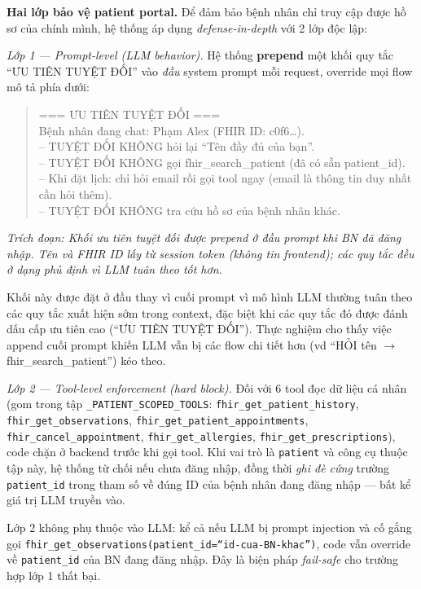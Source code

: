 \documentclass[a4paper,13pt,3p,twoside,openany]{report}
\theoremstyle{definition}
\theoremstyle{remark}
\theoremstyle{definition}
\begin{document}
\textbf{Hai lớp bảo vệ patient portal.} Để đảm bảo bệnh nhân chỉ truy cập được hồ sơ của chính mình, hệ thống áp dụng \textit{defense-in-depth} với 2 lớp độc lập:

\textit{Lớp 1 --- Prompt-level (LLM behavior).} Hệ thống \textbf{prepend} một khối quy tắc ``ƯU TIÊN TUYỆT ĐỐI'' vào \textit{đầu} system prompt mỗi request, override mọi flow mô tả phía dưới:

\begin{quote}
=== ƯU TIÊN TUYỆT ĐỐI ===\\
Bệnh nhân đang chat: Phạm Alex (FHIR ID: c0f6\dots).\\[3pt]
-- TUYỆT ĐỐI KHÔNG hỏi lại ``Tên đầy đủ của bạn''.\\
-- TUYỆT ĐỐI KHÔNG gọi fhir\_search\_patient (đã có sẵn patient\_id).\\
-- Khi đặt lịch: chỉ hỏi email rồi gọi tool ngay (email là thông tin duy nhất cần hỏi thêm).\\
-- TUYỆT ĐỐI KHÔNG tra cứu hồ sơ của bệnh nhân khác.
\end{quote}
\textit{Trích đoạn: Khối ưu tiên tuyệt đối được prepend ở đầu prompt khi BN đã đăng nhập. Tên và FHIR ID lấy từ session token (không tin frontend); các quy tắc đều ở dạng phủ định vì LLM tuân theo tốt hơn.}

Khối này được đặt ở đầu thay vì cuối prompt vì mô hình LLM thường tuân theo các quy tắc xuất hiện sớm trong context, đặc biệt khi các quy tắc đó được đánh dấu cấp ưu tiên cao (``ƯU TIÊN TUYỆT ĐỐI''). Thực nghiệm cho thấy việc append cuối prompt khiến LLM vẫn bị các flow chi tiết hơn (vd ``HỎI tên $\to$ fhir\_search\_patient'') kéo theo.

\textit{Lớp 2 --- Tool-level enforcement (hard block).} Đối với 6 tool đọc dữ liệu cá nhân (gom trong tập \texttt{\_PATIENT\_SCOPED\_TOOLS}: \texttt{fhir\_get\_patient\_history}, \texttt{fhir\_get\_observations}, \texttt{fhir\_get\_patient\_appointments}, \texttt{fhir\_cancel\_appointment}, \texttt{fhir\_get\_allergies}, \texttt{fhir\_get\_prescriptions}), code chặn ở backend trước khi gọi tool. Khi vai trò là \texttt{patient} và công cụ thuộc tập này, hệ thống từ chối nếu chưa đăng nhập, đồng thời \textit{ghi đè cứng} trường \texttt{patient\_id} trong tham số về đúng ID của bệnh nhân đang đăng nhập --- bất kể giá trị LLM truyền vào.

Lớp 2 không phụ thuộc vào LLM: kể cả nếu LLM bị prompt injection và cố gắng gọi \texttt{fhir\_get\_observations(patient\_id=``id-cua-BN-khac'')}, code vẫn override về \texttt{patient\_id} của BN đang đăng nhập. Đây là biện pháp \textit{fail-safe} cho trường hợp lớp 1 thất bại.
\end{document}
